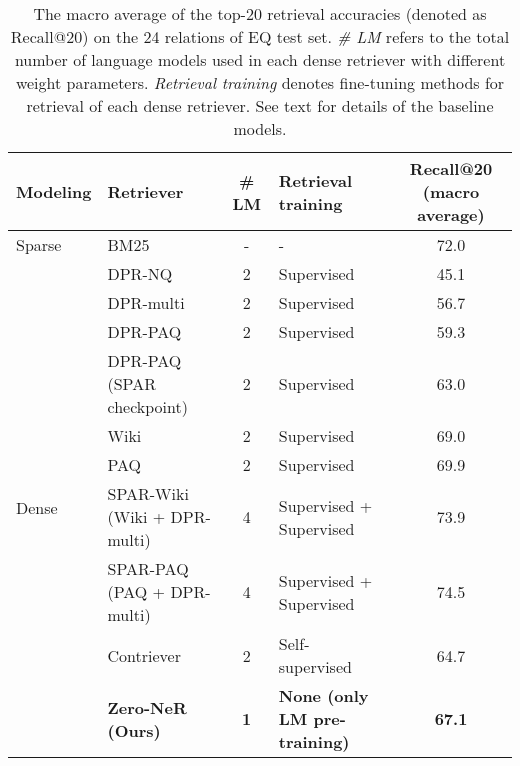\documentclass[letterpaper]{article} \usepackage{aaai23}  \usepackage{times}  \usepackage{helvet}  \usepackage{courier}  \usepackage[hyphens]{url}  \usepackage{graphicx} \urlstyle{rm} \def\UrlFont{\rm}  \usepackage{natbib}  \usepackage{caption} \frenchspacing  \setlength{\pdfpagewidth}{8.5in}  \setlength{\pdfpageheight}{11in}  \usepackage{algorithm}
\begin{document}
\begin{table*}[t]
	\centering
	\renewcommand{\arraystretch}{1.15}
	\begin{tabular}{llclc}
		\toprule
		\textbf{Modeling}       & \textbf{Retriever}                          & \textbf{\# LM} & \textbf{Retrieval training}          & \textbf{Recall@20 (macro average)} \\
		\midrule
		Sparse                  & BM25                                        & -              & -                                    & 72.0                               \\
		\hline
		\multirow{10}{*}{Dense} & DPR-NQ                                      & 2              & Supervised                           & 45.1                               \\
		                        & DPR-multi                                   & 2              & Supervised                           & 56.7                               \\
		                        & DPR-PAQ \citep{sciavolino-etal-2021-simple} & 2              & Supervised                           & 59.3                               \\
		                        & DPR-PAQ (SPAR checkpoint)                   & 2              & Supervised                           & 63.0                               \\
		                        & Wiki                          & 2              & Supervised                           & 69.0                               \\
		                        & PAQ                           & 2              & Supervised                           & 69.9                               \\
		                        & SPAR-Wiki (Wiki  + DPR-multi) & 4              & Supervised + Supervised              & 73.9                               \\
		                        & SPAR-PAQ (PAQ  + DPR-multi)   & 4              & Supervised + Supervised              & 74.5                               \\
		\cline{2-5}
		                        & Contriever                                  & 2              & Self-supervised                      & 64.7                               \\
		\cline{2-5}
		                        & \textbf{Zero-NeR (Ours)}                    & \textbf{1}     & \textbf{None (only LM pre-training)} & \textbf{67.1}                      \\
		\bottomrule
	\end{tabular}
	\caption{
		The macro average of the top-20 retrieval accuracies (denoted as Recall@20) on the 24 relations of EQ test set.
		\textit{\# LM} refers to the total number of language models used in each dense retriever with different weight parameters.
		\textit{Retrieval training} denotes fine-tuning methods for retrieval of each dense retriever.
		See text for details of the baseline models.
	}
	\label{tab:acc}
\end{table*}
\end{document}
